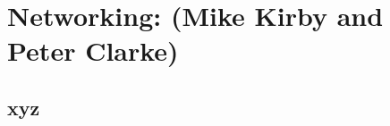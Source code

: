 \chapter{Networking: (Mike Kirby and Peter Clarke)}
\label{ch:netw}

\section{xyz}
\label{sec:netw:xyz}  %

